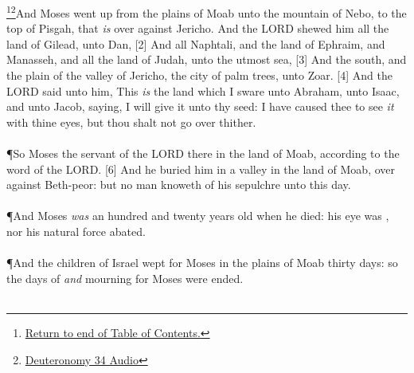 \footnote{\textcolor[cmyk]{0.99998,1,0,0}{\hyperlink{TOC}{Return to end of Table of Contents.}}}\footnote{\href{https://audiobible.com/bible/deuteronomy_34.html}{\textcolor[cmyk]{0.99998,1,0,0}{Deuteronomy 34 Audio}}}\textcolor[cmyk]{0.99998,1,0,0}{And Moses went up from the plains of Moab unto the mountain of Nebo, to the top of Pisgah, that \emph{is} over against Jericho. And the LORD shewed him all the land of Gilead, unto Dan,}
[2] \textcolor[cmyk]{0.99998,1,0,0}{And all Naphtali, and the land of Ephraim, and Manasseh, and all the land of Judah, unto the utmost sea,}
[3] \textcolor[cmyk]{0.99998,1,0,0}{And the south, and the plain of the valley of Jericho, the city of palm trees, unto Zoar.}
[4] \textcolor[cmyk]{0.99998,1,0,0}{And the LORD said unto him, This \emph{is} the land which I sware unto Abraham, unto Isaac, and unto Jacob, saying, I will give it unto thy seed: I have caused thee to see \emph{it} with thine eyes, but thou shalt not go over thither.}\\
\\
\P \textcolor[cmyk]{0.99998,1,0,0}{So Moses the servant of the LORD   there in the land of Moab, according to the word of the LORD.}
[6] \textcolor[cmyk]{0.99998,1,0,0}{And he buried him in a valley in the land of Moab, over against Beth-peor: but no man knoweth of his sepulchre unto this day.}\\
\\
\P \textcolor[cmyk]{0.99998,1,0,0}{And Moses \emph{was} an hundred and twenty years old when he died: his eye was  , nor his natural force abated.}\\
\\
\P \textcolor[cmyk]{0.99998,1,0,0}{And the children of Israel wept for Moses in the plains of Moab thirty days: so the days of   \emph{and} mourning for Moses were ended.}\\
\\
